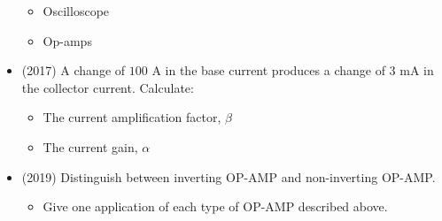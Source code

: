 \documentclass{article}
\begin{document}
\begin{itemize}
 \begin{itemize}
\item Oscilloscope
\item Op-amps
\end{itemize}
\item (2017)  A change of $ 100$ A in the base current produces a change of $ 3$ mA in the collector current. Calculate:
 \begin{itemize}
\item The current amplification factor, $ \beta$
\item The current gain, $ \alpha $
\end{itemize}
\item (2019)  Distinguish between inverting OP-AMP and non-inverting OP-AMP. 
 \begin{itemize}
\item Give one application of each type of OP-AMP described above.
\end{itemize}
\end{itemize}
\end{document}
